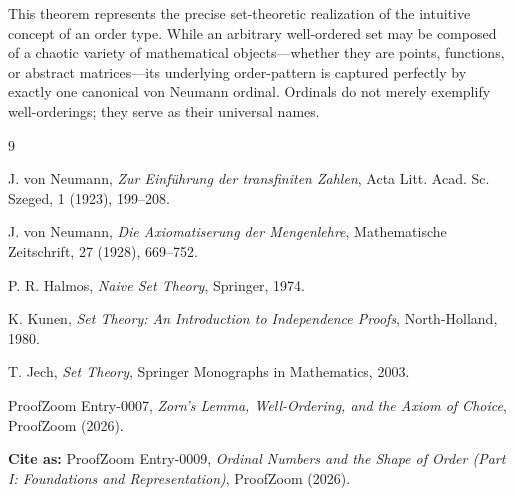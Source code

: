 \documentclass[11pt]{article}
\begin{document}
This theorem represents the precise set-theoretic realization of the intuitive concept of an order type. While an arbitrary well-ordered set may be composed of a chaotic variety of mathematical objects—whether they are points, functions, or abstract matrices—its underlying order-pattern is captured perfectly by exactly one canonical von Neumann ordinal. Ordinals do not merely exemplify well-orderings; they serve as their universal names.
\begin{thebibliography}{9}

J. von Neumann, \emph{Zur Einführung der transfiniten Zahlen}, Acta Litt. Acad. Sc. Szeged, 1 (1923), 199–208.

J. von Neumann, \emph{Die Axiomatiserung der Mengenlehre}, Mathematische Zeitschrift, 27 (1928), 669–752.

P. R. Halmos, \emph{Naive Set Theory}, Springer, 1974.

K. Kunen, \emph{Set Theory: An Introduction to Independence Proofs}, North-Holland, 1980.

T. Jech, \emph{Set Theory}, Springer Monographs in Mathematics, 2003.

ProofZoom Entry-0007, \emph{Zorn’s Lemma, Well-Ordering, and the Axiom of Choice}, ProofZoom (2026).

\end{thebibliography}

\vspace{1cm}
\noindent \textbf{Cite as:} ProofZoom Entry-0009, \emph{Ordinal Numbers and the Shape of Order (Part I: Foundations and Representation)}, ProofZoom (2026).
\end{document}
